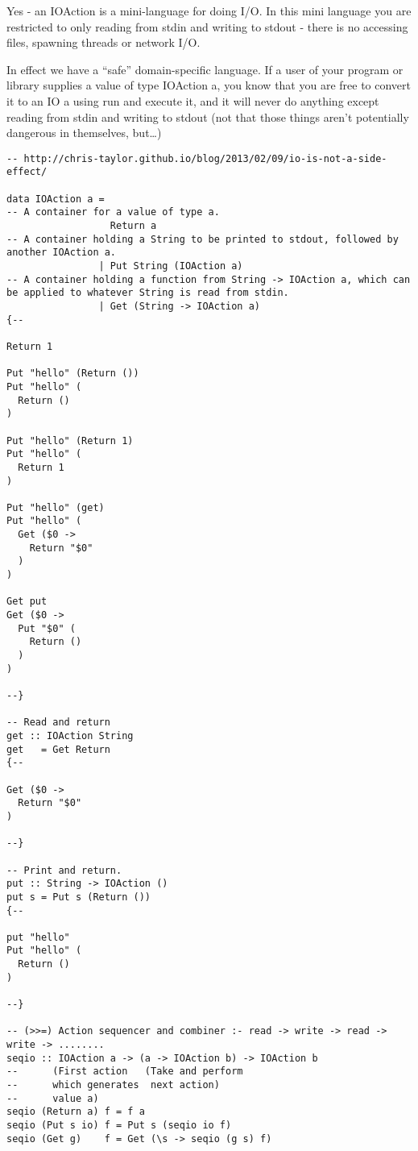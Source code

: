 \documentclass[thesis-solanki.tex]{subfiles}
\begin{document}
Yes - an IOAction is a mini-language for doing I/O. In this mini language you are restricted to only reading from stdin and writing to stdout - there is no accessing files, spawning threads or network I/O.

In effect we have a “safe” domain-specific language. If a user of your program or library supplies a value of type IOAction a, you know that you are free to convert it to an IO a using run and execute it, and it will never do anything except reading from stdin and writing to stdout (not that those things aren’t potentially dangerous in themselves, but…)


\begin{verbatim}
-- http://chris-taylor.github.io/blog/2013/02/09/io-is-not-a-side-effect/

data IOAction a = 
-- A container for a value of type a.
                  Return a 
-- A container holding a String to be printed to stdout, followed by another IOAction a.
                | Put String (IOAction a) 
-- A container holding a function from String -> IOAction a, which can be applied to whatever String is read from stdin.
                | Get (String -> IOAction a)
{--

Return 1

Put "hello" (Return ())
Put "hello" (
  Return ()
)

Put "hello" (Return 1)
Put "hello" (
  Return 1
)

Put "hello" (get)
Put "hello" (
  Get ($0 -> 
    Return "$0"
  )
)

Get put
Get ($0 -> 
  Put "$0" (
    Return ()
  )
)

--}

-- Read and return
get :: IOAction String
get   = Get Return
{--

Get ($0 -> 
  Return "$0"
)

--}

-- Print and return.
put :: String -> IOAction ()
put s = Put s (Return ())
{--

put "hello"
Put "hello" (
  Return ()
)

--}

-- (>>=) Action sequencer and combiner :- read -> write -> read -> write -> ........
seqio :: IOAction a -> (a -> IOAction b) -> IOAction b
--      (First action   (Take and perform                       
--      which generates  next action)
--      value a) 
seqio (Return a) f = f a
seqio (Put s io) f = Put s (seqio io f)
seqio (Get g)    f = Get (\s -> seqio (g s) f)


\end{verbatim}
\end{document}
